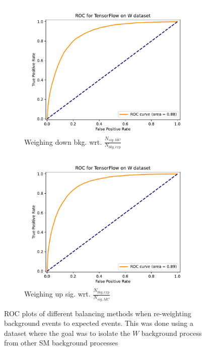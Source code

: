 \documentclass[12pt, a4paper]{book}
\begin{document}
\begin{figure}[!ht]
\begin{subfigure}[b]{0.49\textwidth}
            \centering
            \includegraphics[width=1\textwidth]{bkg_exp/ROC.pdf}
            \caption{Weighing down bkg. wrt. $\frac{N_{sig,MC}}{N_{bkg,exp}}$ }
         \end{subfigure}
         \hfill
         \begin{subfigure}[b]{0.49\textwidth}
            \centering
            \includegraphics[width=1\textwidth]{sig_exp/ROC.pdf}
            \caption{Weighing up sig. wrt. $\frac{N_{bkg,exp}}{N_{sig,MC}}$}
         \end{subfigure}
      \caption[ROC plots for re-weighting background to expected events on NNs]{ROC plots of different balancing methods when re-weighting background events to expected events. 
      This was done using a dataset where the goal was to isolate the $W$ background process from other SM background processes}\label{fig:WROC_rw}
\end{figure}
\end{document}
